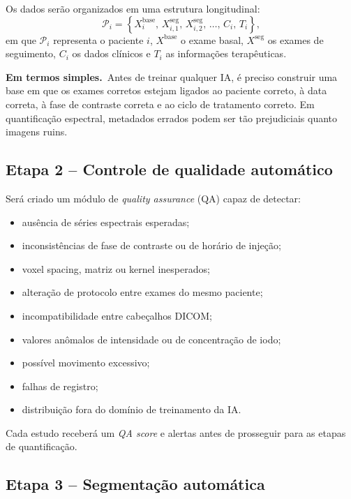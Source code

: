 \documentclass[11pt,a4paper]{article}
\newcommand{\simples}{\textcolor{titleblue}{\textbf{Em termos simples.}}\ }
\begin{document}
Os dados serão organizados em uma estrutura longitudinal:
\begin{equation}
\mathcal{P}_{i} = \left\{ X_{i}^{\text{base}},\, X_{i,1}^{\text{seg}},\, X_{i,2}^{\text{seg}},\, \ldots,\, C_{i},\, T_{i} \right\},
\end{equation}
em que $\mathcal{P}_{i}$ representa o paciente $i$, $X^{\text{base}}$ o exame basal, $X^{\text{seg}}$ os exames de seguimento, $C_{i}$ os dados clínicos e $T_{i}$ as informações terapêuticas.

\begin{caixa}
\simples Antes de treinar qualquer IA, é preciso construir uma base em que os exames corretos estejam ligados ao paciente correto, à data correta, à fase de contraste correta e ao ciclo de tratamento correto. Em quantificação espectral, metadados errados podem ser tão prejudiciais quanto imagens ruins.
\end{caixa}

\subsection{Etapa 2 -- Controle de qualidade automático}

Será criado um módulo de \emph{quality assurance} (QA) capaz de detectar:

\begin{itemize}
\item ausência de séries espectrais esperadas;
\item inconsistências de fase de contraste ou de horário de injeção;
\item voxel spacing, matriz ou kernel inesperados;
\item alteração de protocolo entre exames do mesmo paciente;
\item incompatibilidade entre cabeçalhos DICOM;
\item valores anômalos de intensidade ou de concentração de iodo;
\item possível movimento excessivo;
\item falhas de registro;
\item distribuição fora do domínio de treinamento da IA.
\end{itemize}

Cada estudo receberá um \emph{QA score} e alertas antes de prosseguir para as etapas de quantificação.

\subsection{Etapa 3 -- Segmentação automática}
\end{document}
